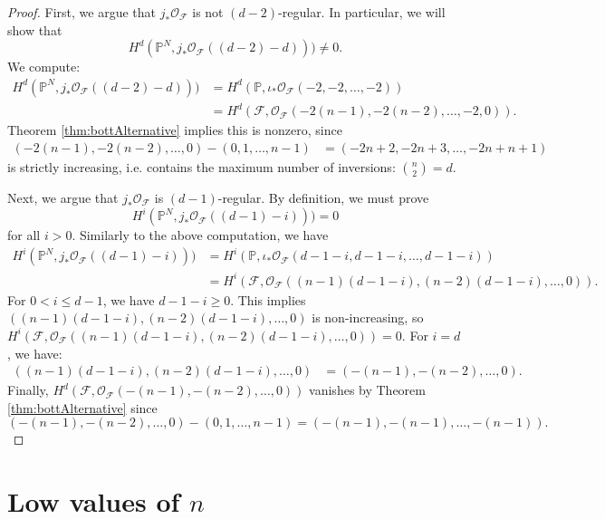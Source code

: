 \documentclass[12pt,reqno]{amsart}
\theoremstyle{definition}
\theoremstyle{remark}
\newcommand{\calF}{{\mathcal{F}}}
\newcommand{\calO}{{\mathcal{O}}}
\begin{document}
\begin{proof}
    First, we argue that $j_*\calO_{\calF}$ is not $(d-2)$-regular.  In particular, we will show that
    \begin{equation*}
        H^d(\mathbb P^N, j_*\calO_{\calF}((d-2)-d))) \neq 0.
    \end{equation*}
    We compute:
    \begin{align*}
        H^d(\mathbb P^N, j_*\calO_{\calF}((d-2)-d))) &= H^d(\mathbb P, \iota_*\calO_{\calF}(-2,-2,\ldots,-2))\\
        &= H^d(\calF, \calO_{\calF}(-2(n-1),-2(n-2),\ldots,-2,0)).
    \end{align*}
    Theorem \ref{thm:bottAlternative} implies this is nonzero, since
    \begin{align*}
    (-2(n-1),-2(n-2),\ldots,0) - (0,1,\ldots,n-1) &= (-2n+2,-2n+3,\ldots,-2n+n+1)
    \end{align*}
    is strictly increasing, i.e. contains the maximum number of inversions: $\binom{n}{2} = d$.

    Next, we argue that $j_*\calO_{\calF}$ is $(d-1)$-regular.  By definition, we must prove
    \begin{equation*}
        H^i(\mathbb P^N, j_*\calO_{\calF}((d-1)-i))) = 0
    \end{equation*}
    for all $i>0$.  Similarly to the above computation, we have
    \begin{align}
        H^i(\mathbb P^N, j_*\calO_{\calF}((d-1)-i))) &= H^i(\mathbb P, \iota_*\calO_{\calF}(d-1-i,d-1-i,\ldots,d-1-i)) \label{eqn:CMreg}\\
        &= H^i(\calF, \calO_{\calF}((n-1)(d-1-i),(n-2)(d-1-i),\ldots, 0)). \nonumber
    \end{align}
    For $0<i\leq d-1$, we have $d-1-i \geq 0$. This implies $((n-1)(d-1-i),(n-2)(d-1-i),\ldots, 0)$ is non-increasing, so $H^i(\calF, \calO_{\calF}((n-1)(d-1-i),(n-2)(d-1-i),\ldots, 0)) = 0$.  For $i = d$, we have:
    \begin{align*}
        ((n-1)(d-1-i),(n-2)(d-1-i),\ldots, 0) &= (-(n-1),-(n-2),\ldots,0).
    \end{align*}
    Finally, $H^d(\calF, \calO_{\calF}(-(n-1),-(n-2),\ldots,0))$ vanishes by Theorem \ref{thm:bottAlternative} since
    \[
    (-(n-1),-(n-2),\ldots,0) - (0,1,\ldots, n-1) = (-(n-1),-(n-1),\ldots,-(n-1)).
    \]\end{proof}


\section{Low values of $n$}
\label{sec:lowValuesN}
\end{document}
